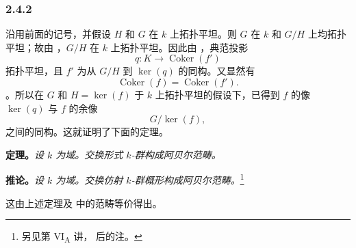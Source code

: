 
\subsubsection*{2.4.2}
\label{sga3:VIIB:2.4.2}

沿用前面的记号，并假设 \(H\) 和 \(G\) 在 \(k\) 上拓扑平坦。则 \(G\) 在 \(k\) 和 \(G/H\) 上均拓扑平坦；故由 ，\(G/H\) 在 \(k\) 上拓扑平坦。因此由 ，典范投影 \[
  q:K\longrightarrow\operatorname{Coker}(f')
\] 拓扑平坦，且 \(f'\) 为从 \(G/H\) 到 \(\ker(q)\) 的同构。又显然有 \[
  \operatorname{Coker}(f)
  =
  \operatorname{Coker}(f').
\]。所以在 \(G\) 和 \(H=\ker(f)\) 于 \(k\) 上拓扑平坦的假设下，已得到 \(f\) 的像 \(\ker(q)\) 与 \(f\) 的余像 \[
  G/\ker(f),
\] 之间的同构。这就证明了下面的定理。

\medskip\noindent\textbf{定理。} \label{sga3:VIIB:2.4.2:theorem}{\itshape 设 \(k\) 为域。交换形式 \(k\)-群构成阿贝尔范畴。}

\medskip\noindent\textbf{推论。} \label{sga3:VIIB:2.4.2:corollary}{\itshape 设 \(k\) 为域。交换仿射 \(k\)-群概形构成阿贝尔范畴。}\footnote{\label{sga3:VIIB:nde:94}另见第 VI\textsubscript{A} 讲， 后的注。}

这由上述定理及  中的范畴等价得出。
